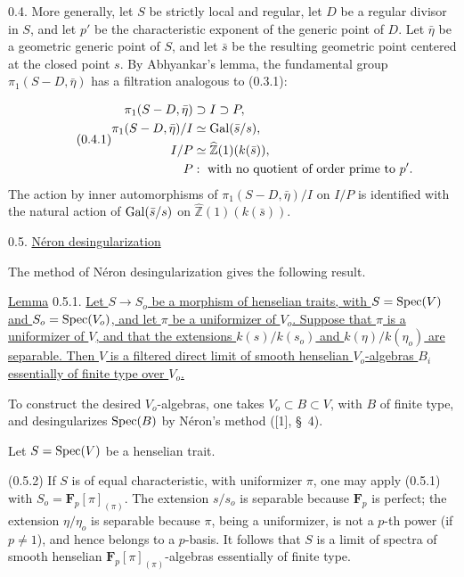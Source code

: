 0.4. More generally, let $S$ be strictly local and regular, let $D$ be a regular divisor in $S$, and let $p'$ be the characteristic exponent of the generic point of $D$. Let $\bar\eta$ be a geometric generic point of $S$, and let $\bar s$ be the resulting geometric point centered at the closed point $s$. By Abhyankar's lemma, the fundamental group $\pi_1(S-D,\bar\eta)$ has a filtration analogous to (0.3.1):

\begin{equation}\tag{0.4.1}
\begin{aligned}
\pi_1(S-D,\bar\eta)&\supset I\supset P,\\
\pi_1(S-D,\bar\eta)/I&\simeq\operatorname{Gal}(\bar s/s),\\
I/P&\simeq\widehat{\mathbb{Z}}(1)(k(\bar s)),\\
P&:\ \text{with no quotient of order prime to }p'.
\end{aligned}
\end{equation}
The action by inner automorphisms of $\pi_1(S-D,\bar\eta)/I$ on $I/P$ is identified with the natural action of $\operatorname{Gal}(\bar s/s)$ on $\widehat{\mathbb{Z}}(1)(k(\bar s))$.

0.5. \underline{N\'eron desingularization}

The method of N\'eron desingularization gives the following result.

\underline{Lemma} 0.5.1. \underline{Let $S\longrightarrow S_o$ be a morphism of henselian traits, with $S=\operatorname{Spec}(V)$ and $S_o=\operatorname{Spec}(V_o)$, and let $\pi$ be a uniformizer of $V_o$. Suppose that $\pi$ is a uniformizer of $V$, and that the extensions $k(s)/k(s_o)$ and $k(\eta)/k(\eta_o)$ are separable. Then $V$ is a filtered direct limit of smooth henselian $V_o$-algebras $B_i$ essentially of finite type over $V_o$.}


To construct the desired $V_o$-algebras, one takes $V_o\subset B\subset V$, with $B$ of finite type, and desingularizes $\operatorname{Spec}(B)$ by N\'eron's method ([1], \S~4).

Let $S=\operatorname{Spec}(V)$ be a henselian trait.

(0.5.2) If $S$ is of equal characteristic, with uniformizer $\pi$, one may apply (0.5.1) with $S_o=\mathbf{F}_p[\pi]_{(\pi)}$. The extension $s/s_o$ is separable because $\mathbf{F}_p$ is perfect; the extension $\eta/\eta_o$ is separable because $\pi$, being a uniformizer, is not a $p$-th power (if $p\neq1$), and hence belongs to a $p$-basis. It follows that $S$ is a limit of spectra of smooth henselian $\mathbf{F}_p[\pi]_{(\pi)}$-algebras essentially of finite type.

